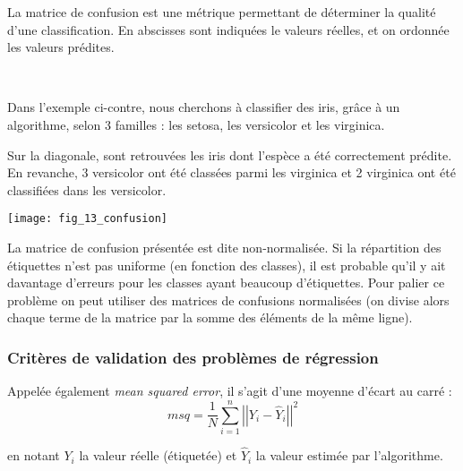 \begin{defi}
La matrice de confusion est une métrique permettant de déterminer la qualité d'une classification. En abscisses sont indiquées le valeurs réelles, et on ordonnée les valeurs prédites. 
\end{defi}
\begin{exemple}~\\

\begin{minipage}[c]{.6\linewidth}
Dans l'exemple ci-contre, nous cherchons à classifier des iris, grâce à un algorithme, selon 3 familles : les setosa, les versicolor et les virginica. 

Sur la diagonale, sont retrouvées les iris dont l'espèce a été correctement prédite. En revanche, 3 versicolor ont été classées parmi les virginica et 2 virginica ont été classifiées dans les versicolor. 

\end{minipage} \hfill
\begin{minipage}[c]{.35\linewidth}
\begin{center}
\texttt{[image: fig\_13\_confusion]}
\end{center}
\end{minipage} 

\end{exemple}

\begin{rem}
La matrice de confusion présentée est dite non-normalisée. Si la répartition des étiquettes n'est pas uniforme (en fonction des classes), il est probable qu'il y ait davantage d'erreurs pour les classes ayant beaucoup d'étiquettes. Pour palier ce problème on peut utiliser des matrices de confusions normalisées (on divise alors chaque terme de la matrice par la somme des éléments de la même ligne).
\end{rem}

\subsubsection{Critères de validation des problèmes de régression}
\begin{defi}
Appelée également \textit{mean squared error}, il s'agit d'une moyenne d'écart au carré : 
$$
msq = \dfrac{1}{N} \sum\limits_{i=1}^n \left|\left|Y_i - \hat{Y}_i \right|\right|^2
$$
 
 en notant $Y_i$ la valeur réelle (étiquetée) et $ \hat{Y}_i$ la valeur estimée par l'algorithme.
\end{defi}

